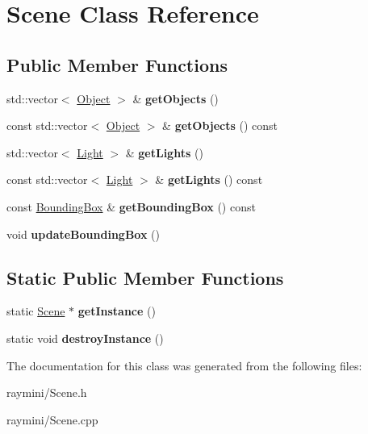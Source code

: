 \hypertarget{class_scene}{
\section{Scene Class Reference}
\label{class_scene}
}
\subsection*{Public Member Functions}
\begin{DoxyCompactItemize}
\item 
\hypertarget{class_scene_a20c231c3b2a4f04d7f2665f7bdd67c4b}{
std::vector$<$ \hyperlink{class_object}{Object} $>$ \& {\bfseries getObjects} ()}
\label{class_scene_a20c231c3b2a4f04d7f2665f7bdd67c4b}

\item 
\hypertarget{class_scene_ab71d7b7035a0e67bc51154cb98089488}{
const std::vector$<$ \hyperlink{class_object}{Object} $>$ \& {\bfseries getObjects} () const }
\label{class_scene_ab71d7b7035a0e67bc51154cb98089488}

\item 
\hypertarget{class_scene_a40077f3e775c7cbb74c2a7a69d159582}{
std::vector$<$ \hyperlink{class_light}{Light} $>$ \& {\bfseries getLights} ()}
\label{class_scene_a40077f3e775c7cbb74c2a7a69d159582}

\item 
\hypertarget{class_scene_a25c81d0cd7c378a1f634ca2f241a9a33}{
const std::vector$<$ \hyperlink{class_light}{Light} $>$ \& {\bfseries getLights} () const }
\label{class_scene_a25c81d0cd7c378a1f634ca2f241a9a33}

\item 
\hypertarget{class_scene_a207ede2c140b6ab80992aa36f8a5b2fa}{
const \hyperlink{class_bounding_box}{BoundingBox} \& {\bfseries getBoundingBox} () const }
\label{class_scene_a207ede2c140b6ab80992aa36f8a5b2fa}

\item 
\hypertarget{class_scene_ae969181c5f4ae4ffd8d48956af1fa26f}{
void {\bfseries updateBoundingBox} ()}
\label{class_scene_ae969181c5f4ae4ffd8d48956af1fa26f}

\end{DoxyCompactItemize}
\subsection*{Static Public Member Functions}
\begin{DoxyCompactItemize}
\item 
\hypertarget{class_scene_ae4f764527c8b962eba443129e023492c}{
static \hyperlink{class_scene}{Scene} $\ast$ {\bfseries getInstance} ()}
\label{class_scene_ae4f764527c8b962eba443129e023492c}

\item 
\hypertarget{class_scene_ab03c74268e0dc459804753552f0eed36}{
static void {\bfseries destroyInstance} ()}
\label{class_scene_ab03c74268e0dc459804753552f0eed36}

\end{DoxyCompactItemize}


The documentation for this class was generated from the following files:\begin{DoxyCompactItemize}
\item 
raymini/Scene.h\item 
raymini/Scene.cpp\end{DoxyCompactItemize}
